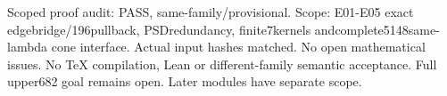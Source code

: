 \documentclass{article}
\begin{document}
Scoped proof audit: PASS, same-family/provisional. Scope: E01-E05 exact edgebridge/196pullback, PSDredundancy, finite7kernels andcomplete5148same-lambda cone interface. Actual input hashes matched. No open mathematical issues. No TeX compilation, Lean or different-family semantic acceptance. Full upper682 goal remains open. Later modules have separate scope.
\end{document}
